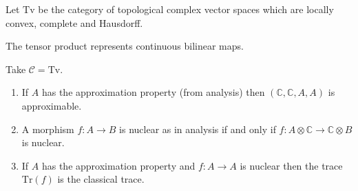 \documentclass{beamer}
\newcommand{\lra}{\longrightarrow}
\def\CC{{\mathscr C}}
\begin{document}
\begin{frame}

Let $\mathrm{Tv}$ be the category of topological complex vector spaces which are locally convex, complete and Hausdorff. 

\bigskip
The tensor product represents continuous bilinear maps.

\bigskip
\begin{theorem} 
Take $\CC = \mathrm{Tv}$.
%
\begin{enumerate}
\item If $A$ has the approximation property (from analysis) then $( \mathbb{C},  \mathbb{C}, A, A)$ is approximable.
\item A morphism $f:A\lra B$ is nuclear as in analysis if and only if $f:A \otimes \mathbb{C} \lra \mathbb{C} \otimes B$ is nuclear.
\item If $A$ has the approximation property and $f:A\lra A$ is nuclear then the trace $\mathrm{Tr}(f)$ is the classical trace.
\end{enumerate}
\end{theorem}
\end{frame}
\end{document}
